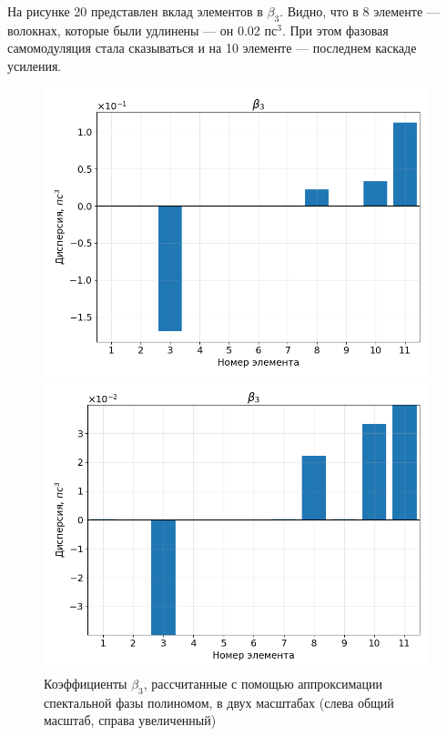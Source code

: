 \documentclass[12pt]{article}
\begin{document}
На рисунке 20 представлен вклад элементов в $\beta_3$. Видно, что в 8 элементе — волокнах, которые были удлинены —
он 0.02 пс$^3$. При этом фазовая самомодуляция стала сказываться и на 10 элементе —
последнем каскаде усиления.

\begin{figure}[h!]
    \centering
    \begin{minipage}[b]{0.5\textwidth}
        \includegraphics[width=\linewidth]{Images/Gauss Pulse x10/Беты/beta_3_full}
    \end{minipage}%
    \begin{minipage}[b]{0.5\textwidth}
        \includegraphics[width=\linewidth]{Images/Gauss Pulse x10/Беты/beta_3_cut}
    \end{minipage}

    \caption{Коэффициенты $\beta_3$, рассчитанные с помощью аппроксимации спектальной фазы полиномом,
     в двух масштабах (слева общий масштаб, справа увеличенный)}
    \label{fig:both}
\end{figure}
\end{document}
